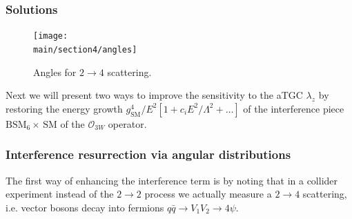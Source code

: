 \documentclass[../report.tex]{subfiles}
\providecommand{\main}{..}
\begin{document}
\subsubsection{Solutions}


\begin{figure}[t]
\begin{center}
\texttt{[image: \\main/section4/angles]}
\end{center}
\vspace{-.3cm}
\caption{Angles for $2\to 4$ scattering. \label{fig:ang}}
\end{figure}

Next we will present two ways to  improve the sensitivity to the aTGC $\lambda_z$ by restoring the energy growth
$g_\text{SM}^4/E^2\left[1+c_i E^2/\Lambda^2+  \dots\right]$ of the interference piece $\text{BSM$_6\times\,$SM}$ of the  $\mathcal{O}_{3W}$ operator.

\subsubsection*{Interference resurrection via angular distributions}
\label{angs}

The first way of enhancing the interference term is by noting that in a collider experiment instead of the  $2\to 2$ process we actually measure a $2\to 4$ scattering, i.e. vector bosons decay into fermions $q\bar q\to V_1V_2\to 4 \psi$.  
\end{document}
